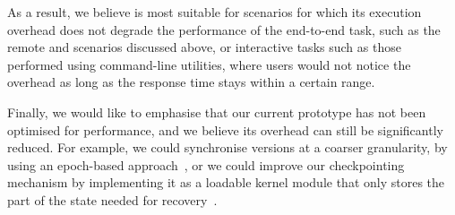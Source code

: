 As a result, we believe \mx is most suitable for scenarios for which
its execution overhead does not degrade the performance of the
end-to-end task, such as the remote \redis and \lighttpd scenarios
discussed above, or interactive tasks such as those performed using
command-line utilities, where users would not notice the overhead as
long as the response time stays within a certain range.


Finally, we would like to emphasise that our current prototype has not
been optimised for performance, and we believe its overhead can still
be significantly reduced.  
For example, we could synchronise versions at a coarser granularity,
by using an epoch-based approach~\cite{compl-schedules11}, or we could
improve our checkpointing mechanism by implementing it as a loadable
kernel module that only stores the part of the state needed for
recovery~\cite{flashback}.





